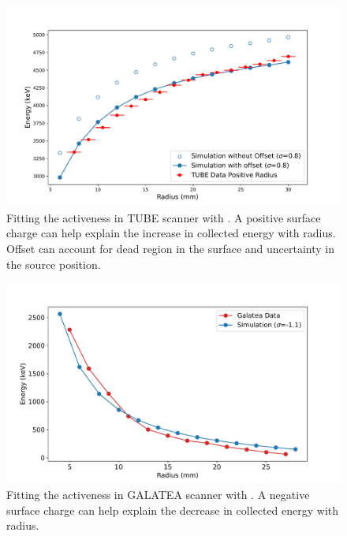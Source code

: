 \begin{figure}%
\includegraphics[trim={0.3cm 0.1cm 1.7cm 0.1cm},clip,width=\linewidth]{ch5/figs/tube_fit.pdf}
\caption{Fitting the activeness in TUBE scanner with \ehd{}. A positive surface charge can help explain the increase in collected energy with radius. Offset can account for dead region in the surface and uncertainty in the source position.}
\label{fig:tube_fit}
\end{figure}


\begin{figure}%
\centering
\includegraphics[trim={0.3cm 0.1cm 1.7cm 1cm},clip,width=\linewidth]{ch5/figs/gal_fit.pdf}
\caption{Fitting the activeness in GALATEA scanner with \ehd{}. A negative surface charge can help explain the decrease in collected energy with radius.}
\label{fig:gal_fit}
\end{figure}

